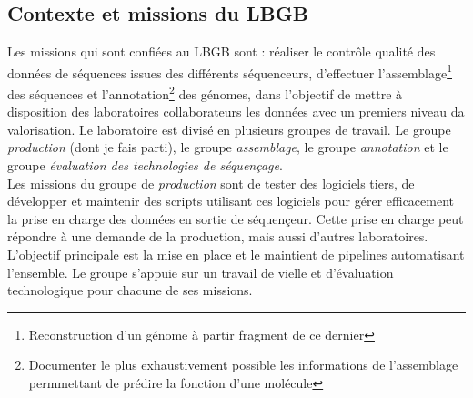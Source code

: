 \subsection{Contexte et missions du LBGB}
Les missions qui sont confiées au LBGB sont : réaliser le contrôle qualité des données de séquences issues des différents séquenceurs, d'effectuer l'assemblage\footnote{Reconstruction d'un génome à partir fragment de ce dernier} des séquences et l'annotation\footnote{Documenter le plus exhaustivement possible les informations de l'assemblage permmettant de prédire la fonction d'une molécule} des génomes, dans l'objectif de mettre à disposition des laboratoires collaborateurs les données avec un premiers niveau da valorisation. Le laboratoire est divisé en plusieurs groupes de travail. Le groupe \emph{production} (dont je fais parti), le groupe \emph{assemblage}, le groupe \emph{annotation} et le groupe \emph{évaluation des technologies de séquençage}.\\

Les missions du groupe de \emph{production} sont de tester des logiciels tiers, de développer et maintenir des scripts utilisant ces logiciels pour gérer efficacement la prise en charge des données en sortie de séquençeur. Cette prise en charge peut répondre à une demande de la production, mais aussi d'autres laboratoires. L'objectif principale est la mise en place et le maintient de pipelines automatisant l'ensemble. Le groupe s'appuie sur un travail de vielle et d'évaluation technologique pour chacune de ses missions. 


